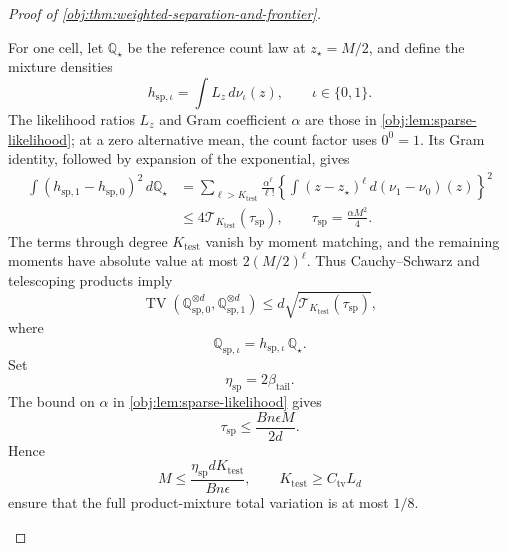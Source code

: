 \documentclass[11pt]{article}
\begin{document}
\begin{proof}[Proof of \cref{obj:thm:weighted-separation-and-frontier}]
\begin{enumerate}
For one cell, let \(\mathbb Q_\star\) be the reference count law at \(z_\star=M/2\), and define the mixture densities
\[
h_{\mathrm{sp},\iota}
=\int L_z\,d\nu_\iota(z),
\qquad \iota\in\{0,1\}.
\]
The likelihood ratios \(L_z\) and Gram coefficient \(\alpha\) are those in
\cref{obj:lem:sparse-likelihood}; at a zero alternative mean, the count factor uses \(0^0=1\). Its Gram identity, followed by expansion of the exponential, gives
\[
\begin{aligned}
\int(h_{\mathrm{sp},1}-h_{\mathrm{sp},0})^2\,d\mathbb Q_\star
&=
\sum_{\ell>K_{\mathrm{test}}}\frac{\alpha^\ell}{\ell!}
\left\{
\int(z-z_\star)^\ell\,d(\nu_1-\nu_0)(z)
\right\}^2\\
&\le
4\mathcal T_{K_{\mathrm{test}}}(\tau_{\mathrm{sp}}),
\qquad
\tau_{\mathrm{sp}}=\frac{\alpha M^2}{4}.
\end{aligned}
\]
The terms through degree \(K_{\mathrm{test}}\) vanish by moment matching, and the remaining moments have absolute value at most
\(2(M/2)^\ell\). Thus Cauchy--Schwarz and telescoping products imply
\[
\operatorname{TV}
\left(\mathbb Q_{\mathrm{sp},0}^{\otimes d},
      \mathbb Q_{\mathrm{sp},1}^{\otimes d}\right)
\le
d\sqrt{\mathcal T_{K_{\mathrm{test}}}(\tau_{\mathrm{sp}})},
\]
where
\[
\mathbb Q_{\mathrm{sp},\iota}
=h_{\mathrm{sp},\iota}\,\mathbb Q_\star.
\]
Set
\[
\eta_{\mathrm{sp}}=2\beta_{\mathrm{tail}}.
\]
The bound on \(\alpha\) in
\cref{obj:lem:sparse-likelihood} gives
\[
\tau_{\mathrm{sp}}\le\frac{Bn\epsilon M}{2d}.
\]
Hence
\[
M\le\frac{\eta_{\mathrm{sp}}dK_{\mathrm{test}}}{Bn\epsilon},
\qquad
K_{\mathrm{test}}\ge C_{\mathrm{tv}}L_d
\]
ensure that the full product-mixture total variation is at most \(1/8\).


\end{enumerate}
\end{proof}
\end{document}
